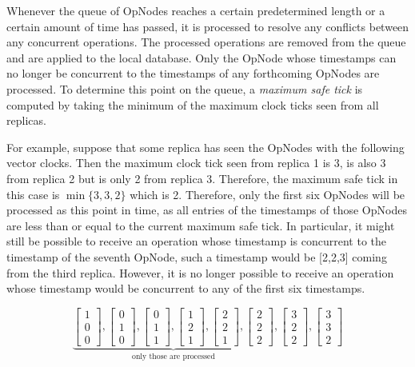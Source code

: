 \documentclass[sigconf,nonacm,10pt]{acmart}
\begin{document}
Whenever the queue of OpNodes reaches a certain predetermined length or a certain amount of time has passed, it is processed to resolve any conflicts between any concurrent operations. The processed operations are removed from the queue and are applied to the local database. Only the OpNode whose timestamps can no longer be concurrent to the timestamps of any forthcoming OpNodes are processed. To determine this point on the queue, a \emph{maximum safe tick} is computed by taking the minimum of the maximum clock ticks seen from all replicas. 

For example, suppose that some replica has seen the OpNodes with the following vector clocks. Then the maximum clock tick seen from replica 1 is 3, is also 3 from replica 2 but is only 2 from replica 3. Therefore, the maximum safe tick in this case is $\min\{3,3,2\}$ which is 2. Therefore, only the first six OpNodes will be processed as this point in time, as all entries of the timestamps of those OpNodes are less than or equal to the current maximum safe tick. In particular, it might still be possible to receive an operation whose timestamp is concurrent to the timestamp of the seventh OpNode, such a timestamp would be [2,2,3] coming from the third replica. However, it is no longer possible to receive an operation whose timestamp would be concurrent to any of the first six timestamps.

$$ \underbrace{\begin{bmatrix} 1\\0\\0 \end{bmatrix},
\begin{bmatrix} 0\\1\\0 \end{bmatrix},
\begin{bmatrix} 0\\1\\1 \end{bmatrix},
\begin{bmatrix} 1\\2\\1 \end{bmatrix},
\begin{bmatrix} 2\\2\\1 \end{bmatrix},
\begin{bmatrix} 2\\2\\2 \end{bmatrix}}_{\text{only those are processed}},
\begin{bmatrix} 3\\2\\2 \end{bmatrix},
\begin{bmatrix} 3\\3\\2 \end{bmatrix}$$
\end{document}
